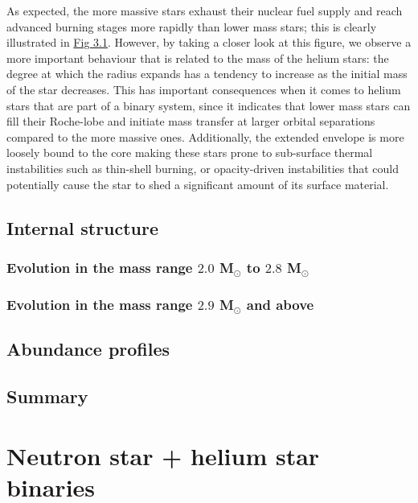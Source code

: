 \documentclass[../../main/thesis_msc.tex]{subfiles}
\begin{document}
					As expected, the more massive stars exhaust their nuclear fuel supply and reach advanced burning stages more rapidly than lower mass stars; this is clearly illustrated in \hyperref[fig:radii_singles]{Fig 3.1}. However, by taking a closer look at this figure, we observe a more important behaviour that is related to the mass of the helium stars: the degree at which the radius expands has a tendency to increase as the initial mass of the star decreases. This has important consequences when it comes to helium stars that are part of a binary system, since it indicates that lower mass stars can fill their Roche-lobe and initiate mass transfer at larger orbital separations compared to the more massive ones. Additionally, the extended envelope is more loosely bound to the core making these stars prone to sub-surface thermal instabilities such as thin-shell burning, or opacity-driven instabilities that could potentially cause the star to shed a significant amount of its surface material. %
					
				\subsection{Internal structure}
				
					\subsubsection{Evolution in the mass range $2.0$ M$_{\odot}$ to $2.8$ M$_{\odot}$}
					
					\subsubsection{Evolution in the mass range $2.9$ M$_{\odot}$ and above}
				
				
				
				\subsection{Abundance profiles}	
				
				
				\subsection{Summary}
			
			
			
			\section{Neutron star + helium star binaries}
\end{document}
